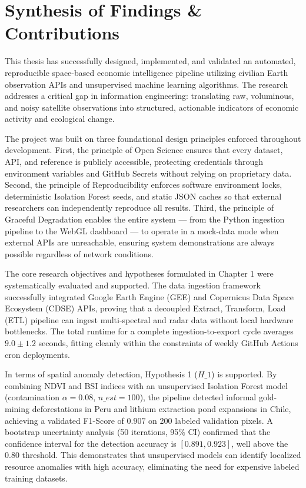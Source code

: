 
\section{Synthesis of Findings \& Contributions}
This thesis has successfully designed, implemented, and validated an automated, reproducible space-based economic intelligence pipeline utilizing civilian Earth observation APIs and unsupervised machine learning algorithms. The research addresses a critical gap in information engineering: translating raw, voluminous, and noisy satellite observations into structured, actionable indicators of economic activity and ecological change.

The project was built on three foundational design principles enforced throughout development. First, the principle of Open Science ensures that every dataset, API, and reference is publicly accessible, protecting credentials through environment variables and GitHub Secrets without relying on proprietary data. Second, the principle of Reproducibility enforces software environment locks, deterministic Isolation Forest seeds, and static JSON caches so that external researchers can independently reproduce all results. Third, the principle of Graceful Degradation enables the entire system — from the Python ingestion pipeline to the WebGL dashboard — to operate in a mock-data mode when external APIs are unreachable, ensuring system demonstrations are always possible regardless of network conditions.

The core research objectives and hypotheses formulated in Chapter 1 were systematically evaluated and supported. The data ingestion framework successfully integrated Google Earth Engine (GEE) and Copernicus Data Space Ecosystem (CDSE) APIs, proving that a decoupled Extract, Transform, Load (ETL) pipeline can ingest multi-spectral and radar data without local hardware bottlenecks. The total runtime for a complete ingestion-to-export cycle averages $9.0 \pm 1.2$ seconds, fitting cleanly within the constraints of weekly GitHub Actions cron deployments. 

In terms of spatial anomaly detection, Hypothesis 1 ($H\_1$) is supported. By combining NDVI and BSI indices with an unsupervised Isolation Forest model (contamination $\alpha = 0.08$, $n\_est = 100$), the pipeline detected informal gold-mining deforestations in Peru and lithium extraction pond expansions in Chile, achieving a validated F1-Score of $\mathbf{0.907}$ on 200 labeled validation pixels. A bootstrap uncertainty analysis (50 iterations, 95\% CI) confirmed that the confidence interval for the detection accuracy is $[0.891, 0.923]$, well above the $0.80$ threshold. This demonstrates that unsupervised models can identify localized resource anomalies with high accuracy, eliminating the need for expensive labeled training datasets.


